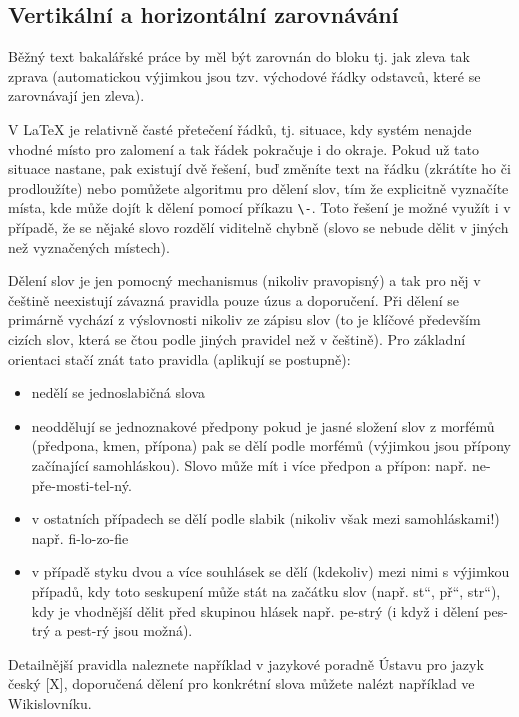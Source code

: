 \documentclass[male,czech,api_bc]{kitheses}
\newcommand{\UV}[1]{\quotedblbase#1\textquotedblleft}
\begin{document}
\subsection{Vertikální a horizontální zarovnávání}

Běžný text bakalářské práce by měl být zarovnán do bloku tj. jak zleva tak zprava (automatickou výjimkou jsou tzv. východové řádky odstavců, které se zarovnávají jen zleva).

V \LaTeX{} je relativně časté přetečení řádků, tj. situace, kdy systém nenajde vhodné místo pro zalomení a tak řádek pokračuje i do okraje. Pokud už tato situace nastane, pak existují dvě řešení, buď změníte text na řádku (zkrátíte ho či prodloužíte) nebo pomůžete algoritmu pro dělení slov, tím že explicitně vyznačíte místa, kde může dojít k dělení pomocí příkazu \verb!\-!. Toto řešení je možné využít i v případě, že se nějaké slovo rozdělí viditelně chybně (slovo se nebude dělit v jiných než vyznačených místech).

Dělení slov je jen pomocný mechanismus (nikoliv pravopisný) a tak pro něj v češtině neexistují závazná pravidla pouze úzus a doporučení. Při dělení se primárně vychází z výslovnosti nikoliv ze zápisu slov (to je klíčové především cizích slov, která se čtou podle jiných pravidel než v češtině). Pro základní orientaci stačí znát tato pravidla (aplikují se postupně):

\begin{itemize}
\item nedělí se jednoslabičná slova
\item neoddělují se jednoznakové předpony
pokud je jasné složení slov z morfémů (předpona, kmen, přípona) pak se dělí podle morfémů (výjimkou jsou přípony začínající samohláskou). Slovo může mít i více předpon a přípon: např. ne-pře-mosti-tel-ný.
\item v ostatních případech se dělí podle slabik (nikoliv však mezi samohláskami!) např. fi-lo-zo-fie
\item v případě styku dvou a více souhlásek se dělí (kdekoliv) mezi nimi s výjimkou případů, kdy toto seskupení může stát na začátku slov (např. \UV{st}, \UV{př}, \UV{str}), kdy je vhodnější dělit před skupinou hlásek např. pe-strý (i když i dělení pes-trý a pest-rý jsou možná).
\end{itemize}

Detailnější pravidla naleznete například v jazykové poradně Ústavu pro jazyk český [X], doporučená dělení pro konkrétní slova můžete nalézt například ve Wikislovníku.
\end{document}
